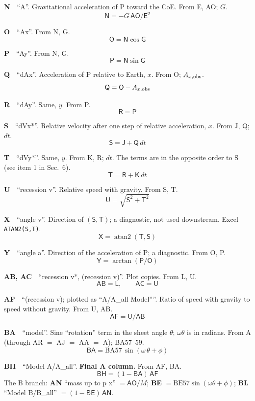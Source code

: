 \documentclass[10pt]{article}
\newcommand{\cl}[1]{\mathsf{#1}}
\newcommand{\col}[3]{\par\smallskip\textbf{#1}\ \ ``#2''. #3}
\begin{document}
\col{N}{A}{Gravitational acceleration of P toward the CoE. From E, AO; $G$.}
\begin{equation}\cl{N}=-G\,\cl{AO}/\cl{E}^2\end{equation}
\col{O}{Ax}{From N, G.}
\begin{equation}\cl{O}=\cl{N}\cos\cl{G}\end{equation}
\col{P}{Ay}{From N, G.}
\begin{equation}\cl{P}=\cl{N}\sin\cl{G}\end{equation}
\col{Q}{dAx}{Acceleration of P relative to Earth, $x$. From O; $A_{x,\rm obs}$.}
\begin{equation}\cl{Q}=\cl{O}-A_{x,\rm obs}\end{equation}
\col{R}{dAy}{Same, $y$. From P.}
\begin{equation}\cl{R}=\cl{P}\end{equation}
\col{S}{dVx*}{Relative velocity after one step of relative acceleration, $x$. From J, Q; $dt$.}
\begin{equation}\cl{S}=\cl{J}+\cl{Q}\,dt\end{equation}
\col{T}{dVy*}{Same, $y$. From K, R; $dt$. The terms are in the opposite order to S (see item 1 in Sec.~6).}
\begin{equation}\cl{T}=\cl{R}+\cl{K}\,dt\end{equation}
\col{U}{recession v}{Relative speed with gravity. From S, T.}
\begin{equation}\cl{U}=\sqrt{\cl{S}^2+\cl{T}^2}\end{equation}
\col{X}{angle v}{Direction of $(\cl{S},\cl{T})$; a diagnostic, not used downstream. Excel \texttt{ATAN2(S,T)}.}
\begin{equation}\cl{X}=\operatorname{atan2}(\cl{T},\cl{S})\end{equation}
\col{Y}{angle a}{Direction of the acceleration of P; a diagnostic. From O, P.}
\begin{equation}\cl{Y}=\arctan(\cl{P}/\cl{O})\end{equation}
\col{AB, AC}{recession v*, (recession v)}{Plot copies. From L, U.}
\begin{equation}\cl{AB}=\cl{L},\qquad \cl{AC}=\cl{U}\end{equation}
\col{AF}{(recession v); plotted as ``A/A\_all Model''}{Ratio of speed with gravity to speed without gravity. From U, AB.}
\begin{equation}\cl{AF}=\cl{U}/\cl{AB}\end{equation}
\col{BA}{model}{Sine ``rotation'' term in the sheet angle $\theta$; $\omega\theta$ is in radians. From A (through AR $=$ AJ $=$ AA $=$ A); BA57--59.}
\begin{equation}\cl{BA}=\mathrm{BA57}\,\sin(\omega\,\theta+\phi)\end{equation}
\col{BH}{Model A/A\_all}{\textbf{Final A column.} From AF, BA.}
\begin{equation}\cl{BH}=(1-\cl{BA})\,\cl{AF}\end{equation}
The B branch: \textbf{AN} ``mass up to p x'' $=\cl{AO}/M$; \textbf{BE} $=\mathrm{BE57}\sin(\omega\theta+\phi)$; \textbf{BL} ``Model B/B\_all'' $=(1-\cl{BE})\,\cl{AN}$.
\end{document}
